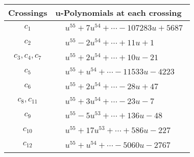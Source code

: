 \documentclass[1p]{elsarticle_modified}
\theoremstyle{definition}
\begin{document}
\begin{tabular}{m{50pt}|m{274pt}}
Crossings & \hspace{64pt}u-Polynomials at each crossing \\
\hline $$\begin{aligned}c_{1}\end{aligned}$$&$\begin{aligned}
&u^{55}+7 u^{54}+\cdots-107283 u+5687
\end{aligned}$\\
\hline $$\begin{aligned}c_{2}\end{aligned}$$&$\begin{aligned}
&u^{55}-2 u^{54}+\cdots+11 u+1
\end{aligned}$\\
\hline $$\begin{aligned}c_{3},c_{4},c_{7}\end{aligned}$$&$\begin{aligned}
&u^{55}+2 u^{54}+\cdots+10 u-21
\end{aligned}$\\
\hline $$\begin{aligned}c_{5}\end{aligned}$$&$\begin{aligned}
&u^{55}+u^{54}+\cdots-11533 u-4223
\end{aligned}$\\
\hline $$\begin{aligned}c_{6}\end{aligned}$$&$\begin{aligned}
&u^{55}+2 u^{54}+\cdots-28 u+47
\end{aligned}$\\
\hline $$\begin{aligned}c_{8},c_{11}\end{aligned}$$&$\begin{aligned}
&u^{55}+3 u^{54}+\cdots-23 u-7
\end{aligned}$\\
\hline $$\begin{aligned}c_{9}\end{aligned}$$&$\begin{aligned}
&u^{55}-5 u^{53}+\cdots+136 u-48
\end{aligned}$\\
\hline $$\begin{aligned}c_{10}\end{aligned}$$&$\begin{aligned}
&u^{55}+17 u^{53}+\cdots+586 u-227
\end{aligned}$\\
\hline $$\begin{aligned}c_{12}\end{aligned}$$&$\begin{aligned}
&u^{55}+u^{54}+\cdots-5060 u-2767
\end{aligned}$\\
\hline
\end{tabular}\\~\\
\end{document}
